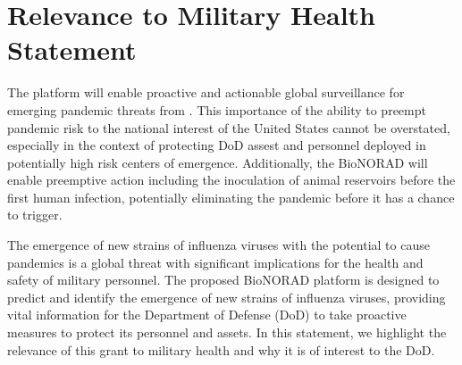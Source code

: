 \documentclass[onecolumn, compsoc,12pt]{IEEEtran}
\begin{document}
\clearpage

\section*{Relevance to Military Health Statement}

The \bnd platform will enable proactive and actionable global surveillance for emerging pandemic threats from \infl. This importance of the ability to preempt pandemic risk to the national interest of the United States cannot be overstated, especially in the context of protecting  DoD assest and personnel deployed in potentially high risk centers of emergence. Additionally, the BioNORAD will enable preemptive action including the inoculation of  animal reservoirs before the first human infection, potentially eliminating the pandemic before it has a chance to  trigger.


The emergence of new strains of influenza viruses with the potential to cause pandemics is a global threat with significant implications for the health and safety of military personnel. The proposed BioNORAD platform is designed to predict and identify the emergence of new strains of influenza viruses, providing vital information for the Department of Defense (DoD) to take proactive measures to protect its personnel and assets. In this statement, we highlight the relevance of this grant to military health and why it is of interest to the DoD.
\end{document}
